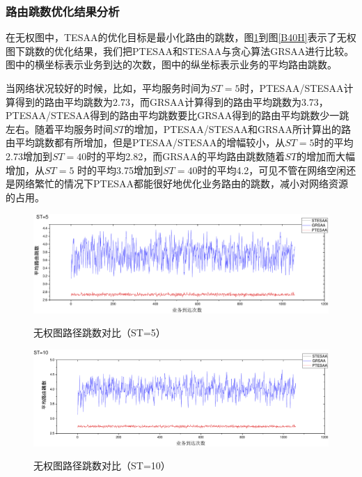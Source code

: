 \subsubsection{路由跳数优化结果分析}

在无权图中，TESAA的优化目标是最小化路由的跳数，图\ref{B5H}到图\ref{B40H}表示了无权图下跳数的优化结果，我们把PTESAA和STESAA与贪心算法GRSAA进行比较。图中的横坐标表示业务到达的次数，图中的纵坐标表示业务的平均路由跳数。

当网络状况较好的时候，比如，平均服务时间为$ST=5$时，PTESAA/STESAA计算得到的路由平均跳数为2.73，而GRSAA计算得到的路由平均跳数为3.73，PTESAA/STESAA得到的路由平均跳数要比GRSAA得到的路由平均跳数少一跳左右。随着平均服务时间$ST$的增加，PTESAA/STESAA和GRSAA所计算出的路由平均跳数都有所增加，但是PTESAA/STESAA的增幅较小，从$ST=5$时的平均2.73增加到$ST=40$时的平均2.82，而GRSAA的平均路由跳数随着$ST$的增加而大幅增加，从$ST=5$ 时的平均3.75增加到$ST=40$时的平均4.2，可见不管在网络空闲还是网络繁忙的情况下PTESAA都能很好地优化业务路由的跳数，减小对网络资源的占用。
\begin{figure}
\setlength{\abovecaptionskip}{-0.5cm}
\begin{center}
{\includegraphics[width=1 \textwidth]{figures/B5H.pdf}}
\end{center}
\caption{{\footnotesize{无权图路径跳数对比（ST=5）}}}
\label{B5H}
\end{figure}
\begin{figure}
\vspace{-0.5cm}
\setlength{\abovecaptionskip}{-0.5cm}
\begin{center}
{\includegraphics[width=1 \textwidth]{figures/B10H.pdf}}
\end{center}
\caption{{\footnotesize{无权图路径跳数对比（ST=10）}}}
\label{B10H}
\end{figure}
